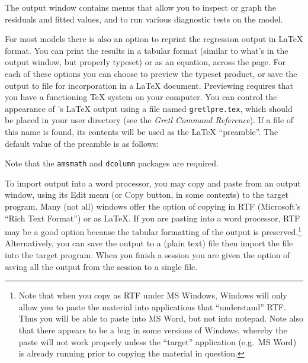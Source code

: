 The output window contains menus that allow you to inspect or graph
the residuals and fitted values, and to run various diagnostic tests
on the model. 

For most models there is also an option to reprint the regression
output in {\LaTeX} format.  You can print the results in a tabular
format (similar to what's in the output window, but properly typeset)
or as an equation, across the page.  For each of these options you can
choose to preview the typeset product, or save the output to file for
incorporation in a {\LaTeX} document.  Previewing requires that you
have a functioning {\TeX} system on your computer.  You can control
the appearance of 's {\LaTeX} output using a file named
\verb+gretlpre.tex+, which should be placed in your  user
directory (see the \emph{Gretl Command Reference}).  If a file of this
name is found, its contents will be used as the {\LaTeX} ``preamble''.
The default value of the preamble is as follows:
    

Note that the \verb+amsmath+ and \verb+dcolumn+ packages are required.

To import  output into a word processor, you may copy and
paste from an output window, using its \textsf{Edit} menu (or Copy
button, in some contexts) to the target program.  Many (not all)
 windows offer the option of copying in RTF (Microsoft's
``Rich Text Format'') or as {\LaTeX}. If you are pasting into a word
processor, RTF may be a good option because the tabular formatting of
the output is preserved.\footnote{Note that when you copy as RTF under
  MS Windows, Windows will only allow you to paste the material into
  applications that ``understand'' RTF.  Thus you will be able to
  paste into MS Word, but not into notepad.  Note also that there
  appears to be a bug in some versions of Windows, whereby the paste
  will not work properly unless the ``target'' application (e.g.\  MS
  Word) is already running prior to copying the material in question.}
Alternatively, you can save the output to a (plain text) file then
import the file into the target program.  When you finish a
 session you are given the option of saving all the output
from the session to a single file.

